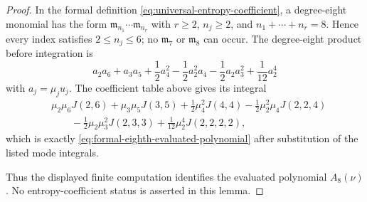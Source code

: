 \begin{proof}
In the formal definition \eqref{eq:universal-entropy-coefficient}, a
degree-eight monomial has the form
\(\mathfrak m_{n_1}\cdots\mathfrak m_{n_r}\) with \(r\ge2\),
\(n_j\ge2\), and \(n_1+\cdots+n_r=8\).  Hence every index satisfies
\(2\le n_j\le6\); no \(\mathfrak m_7\) or \(\mathfrak m_8\) can occur.
The degree-eight product before integration is
\[
a_2a_6+a_3a_5+\frac12a_4^2
-\frac12a_2^2a_4-\frac12a_2a_3^2+\frac1{12}a_2^4
\]
with \(a_j=\mu_j u_j\).  The coefficient table above gives its integral
\[
\begin{aligned}
&\mu_2\mu_6 J(2,6)+\mu_3\mu_5 J(3,5)
+\frac12\mu_4^2 J(4,4)
-\frac12\mu_2^2\mu_4 J(2,2,4)\\
&\qquad
-\frac12\mu_2\mu_3^2 J(2,3,3)
+\frac1{12}\mu_2^4 J(2,2,2,2),
\end{aligned}
\]
which is exactly \eqref{eq:formal-eighth-evaluated-polynomial} after
substitution of the listed mode integrals.

Thus the displayed finite computation identifies the evaluated polynomial
\(A_8(\nu)\).  No entropy-coefficient status is asserted in
this lemma.
\end{proof}

